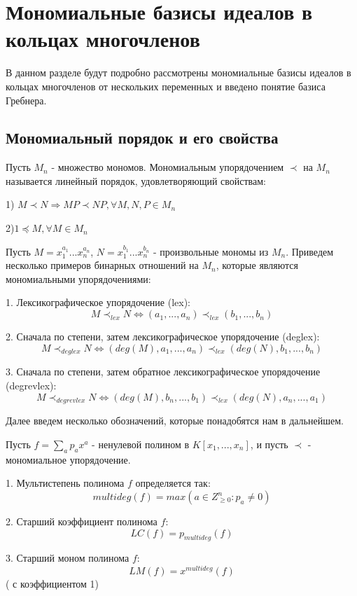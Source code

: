 \section{Мономиальные базисы идеалов в кольцах многочленов} 

В данном разделе будут подробно рассмотрены мономиальные базисы идеалов в кольцах многочленов от нескольких переменных и введено понятие базиса Гребнера.

\subsection{Мономиальный порядок и его свойства}
Пусть $ M_{n} $ - множество мономов. 
Мономиальным упорядочением $ \prec $ на $ M_{n} $ называется линейный порядок, удовлетворяющий свойствам:

1)  $M \prec N \Rightarrow MP \prec NP,  \forall M, N, P \in M_{n}$ 

2)$ 1 \preceq M,  \forall M \in M_{n} $

Пусть $ M = x_{1}^{a_{1}}...x_{n}^{a_{n}} $, $ N = x_{1}^{b_{1}}...x_{n}^{b_{n}} $ - произвольные мономы из $ M_{n} $.
Приведем несколько примеров бинарных отношений на $M_{n}$, которые являются мономиальными упорядочениями:

1.  Лексикографическое упорядочение (lex):
$$ M \prec_{lex} N \Leftrightarrow (a_{1}, ... , a_{n}) \prec_{lex} (b_{1}, ..., b_{n}) $$

2. Сначала по степени, затем лексикографическое упорядочение (deglex):
$$ M \prec_{deglex} N \Leftrightarrow (deg(M), a_{1}, ... , a_{n}) \prec_{lex} (deg(N), b_{1}, ..., b_{n}) $$

3. Сначала по степени, затем обратное лексикографическое упорядочение (degrevlex):
$$ M \prec_{degrevlex} N \Leftrightarrow (deg(M), b_{n}, ... , b_{1}) \prec_{lex} (deg(N), a_{n}, ..., a_{1}) $$

Далее введем несколько обозначений, которые понадобятся нам в дальнейшем.

Пусть $ f= \sum_{a}p_{a}x^{a}$ - ненулевой полином в $K \left[ x_{1}, ... , x_{n} \right]$, и пусть $ \prec $ - мономиальное упорядочение.

1. Мультистепень полинома $f$ определяется так:
$$ multideg(f) = max(a \in Z_{\geq0}^{n}: p_{a} \neq 0) $$

2. Старший коэффициент полинома $f$:
$$ LC(f) = p_{multideg}(f) $$

3. Старший моном полинома $f$:
$$ LM(f) = x^{multideg}(f) $$ ( с коэффициентом 1)

